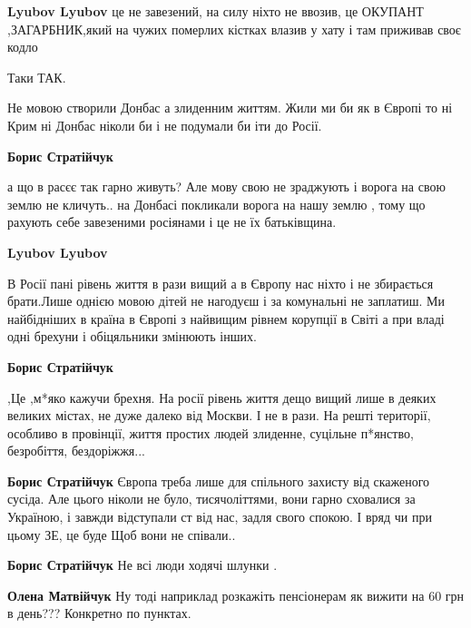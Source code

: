 \begin{itemize}
\begin{itemize}
\textbf{Lyubov Lyubov} це не завезений, на силу ніхто не ввозив, це ОКУПАНТ ,ЗАГАРБНИК,який на чужих померлих кістках влазив у хату і там приживав своє кодло

\end{itemize} %

Таки ТАК.

Не мовою створили Донбас а злиденним життям. Жили ми би як в Європі то ні Крим ні Донбас ніколи би і не подумали би іти до Росії.

\begin{itemize} %
\textbf{Борис Стратійчук} 

а що в расєє так гарно живуть? Але мову свою не зраджують і ворога на свою
землю не кличуть.. на Донбасі покликали ворога на нашу землю , тому що рахують
себе завезеними росіянами і це не їх батьківщина.

\begin{itemize} %
\textbf{Lyubov Lyubov} 

В Росії пані рівень життя в рази вищий а в Європу нас ніхто і не збирається
брати.Лише однією мовою дітей не нагодуєш і за комунальні не заплатиш. Ми
найбідніших в країна в Європі з найвищим рівнем корупції в Світі а при владі
одні брехуни і обіцяльники змінюють інших.


\textbf{Борис Стратійчук} 

,Це ,м*яко кажучи брехня. На росії рівень життя дещо вищий лише в деяких великих
містах, не дуже далеко від Москви. І не в рази. На решті території, особливо в
провінції, життя простих людей злиденне, суцільне
п*янство, безробіття, бездоріжжя...


\textbf{Борис Стратійчук} Європа треба лише для спільного захисту від скаженого сусіда. Але цього ніколи не було, тисячоліттями, вони гарно сховалися за Україною, і завжди відступали ст від нас, задля свого спокою. І вряд чи при цьому ЗЕ, це буде Щоб вони не співали..
\end{itemize} %

\end{itemize} %

\textbf{Борис Стратійчук} Не всі люди ходячі шлунки .

\begin{itemize} %
\textbf{Олена Матвійчук} Ну тоді наприклад розкажіть пенсіонерам як вижити на 60 грн в день??? Конкретно по пунктах.


\end{itemize}
\end{itemize}
